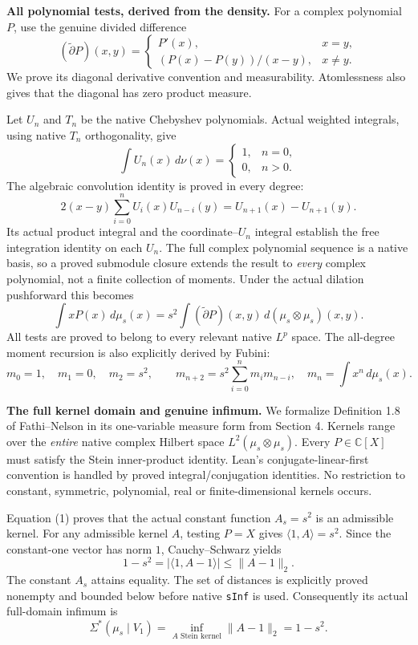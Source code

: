 \documentclass[11pt]{article}
\newcommand{\C}{\mathbb C}
\newcommand{\Sig}{\Sigma^*}
\newcommand{\dd}{\widetilde\partial}
\begin{document}
\newpage
\textbf{All polynomial tests, derived from the density.}
For a complex polynomial $P$, use the genuine divided difference
\[
 (\dd P)(x,y)=
 \begin{cases}P'(x),&x=y,\\[2pt]
 (P(x)-P(y))/(x-y),&x\ne y.
 \end{cases}
\]
We prove its diagonal derivative convention and measurability. Atomlessness
also gives that the diagonal has zero product measure.

Let $U_n$ and $T_n$ be the native Chebyshev polynomials. Actual weighted
integrals, using native $T_n$ orthogonality, give
\[
 \int U_n(x)\,d\nu(x)=\begin{cases}1,&n=0,\\0,&n>0.\end{cases}
\]
The algebraic convolution identity is proved in every degree:
\[
 2(x-y)\sum_{i=0}^n U_i(x)U_{n-i}(y)
   =U_{n+1}(x)-U_{n+1}(y).
\]
Its actual product integral and the coordinate--$U_n$ integral establish
the free integration identity on each $U_n$. The full complex polynomial
sequence is a native basis, so a proved submodule closure extends the result
to \emph{every} complex polynomial, not a finite collection of moments.
Under the actual dilation pushforward this becomes
\begin{equation}
 \int xP(x)\,d\mu_s(x)
   =s^2\int (\dd P)(x,y)\,d(\mu_s\otimes\mu_s)(x,y).
 \tag{1}
\end{equation}
All tests are proved to belong to every relevant native $L^p$ space.
The all-degree moment recursion is also explicitly derived by Fubini:
\[
 m_0=1,\quad m_1=0,\quad m_2=s^2,\qquad
 m_{n+2}=s^2\sum_{i=0}^n m_i m_{n-i},
 \quad m_n=\int x^n\,d\mu_s(x).
\]

\textbf{The full kernel domain and genuine infimum.}
We formalize Definition 1.8 of Fathi--Nelson in its one-variable measure
form from Section 4. Kernels range over the \emph{entire} native complex
Hilbert space $L^2(\mu_s\otimes\mu_s)$. Every $P\in\C[X]$ must satisfy the
Stein inner-product identity. Lean's conjugate-linear-first convention is
handled by proved integral/conjugation identities. No restriction to
constant, symmetric, polynomial, real or finite-dimensional kernels occurs.

Equation (1) proves that the actual constant function $A_s=s^2$ is an
admissible kernel. For any admissible kernel $A$, testing $P=X$ gives
$\langle1,A\rangle=s^2$. Since the constant-one vector has norm $1$,
Cauchy--Schwarz yields
\[
 1-s^2=|\langle1,A-1\rangle|\le\|A-1\|_2.
\]
The constant $A_s$ attains equality. The set of distances is explicitly
proved nonempty and bounded below before native \texttt{sInf} is used.
Consequently its actual full-domain infimum is
\[
 \boxed{\Sig(\mu_s\mid V_1)=\inf_{A\text{ Stein kernel}}\|A-1\|_2=1-s^2.}
\]
\end{document}
